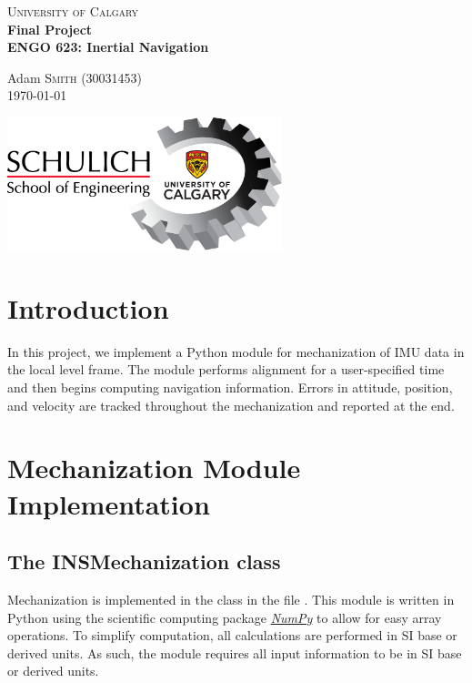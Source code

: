 \documentclass[11pt, oneside]{article}   	%
\begin{document}
\begin{titlepage}

	\center
	\textsc{\LARGE University of Calgary}\\[1.5cm]
	\vfill
	{\huge\bfseries Final Project}\\[0.4cm]
	{\huge\bfseries ENGO 623: Inertial Navigation}
	
	\vfill\vfill\vfill\vfill
	
	Adam \textsc{Smith} (30031453)\\
	
	\vfill\vfill\vfill
	{\large \today}
	
	\vfill\vfill\vfill
	\includegraphics[width=8cm,]{img/schulich.png}\\[1cm]	
\end{titlepage}

\section{Introduction}
In this project, we implement a Python module for mechanization of IMU data in the local level frame.  The module performs alignment for a user-specified time and then begins computing navigation information. Errors in attitude, position, and velocity are tracked throughout the mechanization and reported at the end.

\section{Mechanization Module Implementation}

\subsection{The INSMechanization class}
Mechanization is implemented in the  class in the file .  This module is written in Python using the scientific computing package \href{https://numpy.org}{\textit{NumPy}} to allow for easy array operations.  To simplify computation, all calculations are performed in SI base or derived units. As such, the module requires all input information to be in SI base or derived units.  
\end{document}

